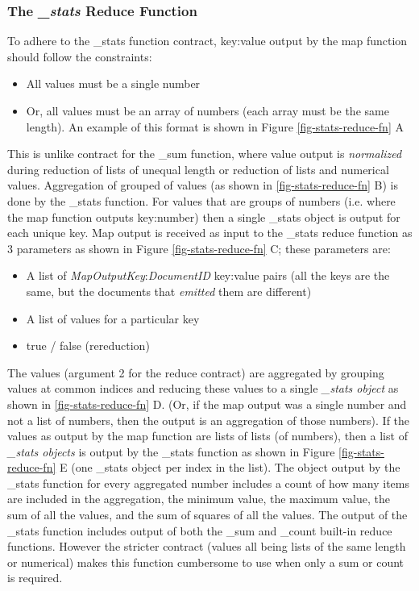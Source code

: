 

\subsubsection{The \textit{\_stats} Reduce Function}
To adhere to the \_stats function contract, key:value output by the map function should follow the constraints:

\begin{itemize}
    \item All values must be a single number
    \item Or, all values must be an array of numbers (each array must be the same length). An example of this format is shown in Figure \ref{fig-stats-reduce-fn} A
\end{itemize}

This is unlike contract for the \_sum function, where value output is \textit{normalized} during reduction of lists of unequal length or reduction of lists and numerical values. Aggregation of grouped of values (as shown in \ref{fig-stats-reduce-fn} B) is done by the \_stats function. For values that are groups of numbers (i.e. where the map function outputs key:number) then a single \_stats object is output for each unique key. Map output is received as input to the \_stats reduce function as 3 parameters as shown in Figure \ref{fig-stats-reduce-fn} C; these parameters are:

\begin{itemize}
    \item A list of \textit{MapOutputKey}:\textit{DocumentID} key:value pairs (all the keys are the same, but the documents that \textit{emitted} them are different)
    \item A list of values for a particular key
    \item true / false (rereduction)
\end{itemize}

The values (argument 2 for the reduce contract) are aggregated by grouping values at common indices and reducing these values to a single \textit{\_stats object} as shown in \ref{fig-stats-reduce-fn} D. (Or, if the map output was a single number and not a list of numbers, then the output is an aggregation of those numbers). If the values as output by the map function are lists of lists (of numbers), then a list of \textit{\_stats objects} is output by the \_stats function as shown in Figure \ref{fig-stats-reduce-fn} E (one \_stats object per index in the list). The object output by the \_stats function for every aggregated number includes a count of how many items are included in the aggregation, the minimum value, the maximum value, the sum of all the values, and the sum of squares of all the values. The output of the \_stats function includes output of both the \_sum and \_count built-in reduce functions. However the stricter contract (values all being lists of the same length or numerical) makes this function cumbersome to use when only a sum or count is required.

